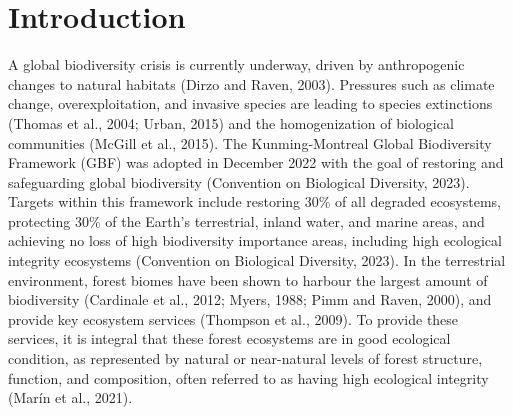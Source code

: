 \documentclass[
]{agujournal2019}
\begin{document}
\section{Introduction}\label{introduction}

A global biodiversity crisis is currently underway, driven by
anthropogenic changes to natural habitats (Dirzo and Raven, 2003).
Pressures such as climate change, overexploitation, and invasive species
are leading to species extinctions (Thomas et al., 2004; Urban, 2015)
and the homogenization of biological communities (McGill et al., 2015).
The Kunming-Montreal Global Biodiversity Framework (GBF) was adopted in
December 2022 with the goal of restoring and safeguarding global
biodiversity (Convention on Biological Diversity, 2023). Targets within
this framework include restoring 30\% of all degraded ecosystems,
protecting 30\% of the Earth's terrestrial, inland water, and marine
areas, and achieving no loss of high biodiversity importance areas,
including high ecological integrity ecosystems (Convention on Biological
Diversity, 2023). In the terrestrial environment, forest biomes have
been shown to harbour the largest amount of biodiversity (Cardinale et
al., 2012; Myers, 1988; Pimm and Raven, 2000), and provide key ecosystem
services (Thompson et al., 2009). To provide these services, it is
integral that these forest ecosystems are in good ecological condition,
as represented by natural or near-natural levels of forest structure,
function, and composition, often referred to as having high ecological
integrity (Marín et al., 2021).
\end{document}

